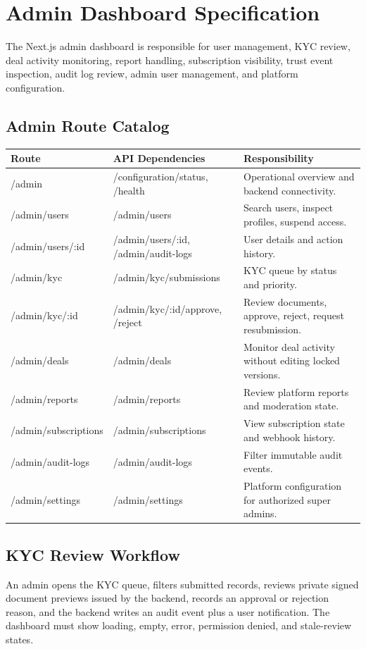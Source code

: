 \chapter{Admin Dashboard Specification}
The Next.js admin dashboard is responsible for user management, KYC review, deal activity monitoring, report handling, subscription visibility, trust event inspection, audit log review, admin user management, and platform configuration.

\section{Admin Route Catalog}
\begin{longtable}{p{}p{}p{}}
\toprule
Route & API Dependencies & Responsibility \\
\midrule
/admin & /configuration/status, /health & Operational overview and backend connectivity. \\
/admin/users & /admin/users & Search users, inspect profiles, suspend access. \\
/admin/users/:id & /admin/users/:id, /admin/audit-logs & User details and action history. \\
/admin/kyc & /admin/kyc/submissions & KYC queue by status and priority. \\
/admin/kyc/:id & /admin/kyc/:id/approve, /reject & Review documents, approve, reject, request resubmission. \\
/admin/deals & /admin/deals & Monitor deal activity without editing locked versions. \\
/admin/reports & /admin/reports & Review platform reports and moderation state. \\
/admin/subscriptions & /admin/subscriptions & View subscription state and webhook history. \\
/admin/audit-logs & /admin/audit-logs & Filter immutable audit events. \\
/admin/settings & /admin/settings & Platform configuration for authorized super admins. \\
\bottomrule
\end{longtable}

\section{KYC Review Workflow}
An admin opens the KYC queue, filters submitted records, reviews private signed document previews issued by the backend, records an approval or rejection reason, and the backend writes an audit event plus a user notification. The dashboard must show loading, empty, error, permission denied, and stale-review states.

